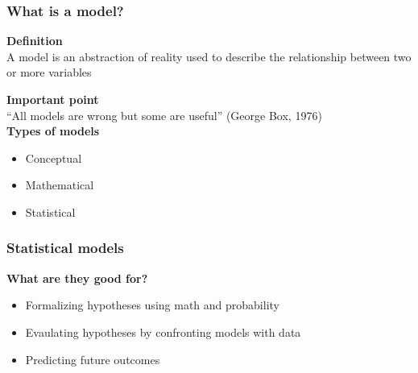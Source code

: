 \documentclass[color=usenames,dvipsnames]{beamer}\usepackage[]{graphicx}\usepackage[]{color}
\begin{document}







\begin{frame}
  \frametitle{What is a model?}
  \large
    {\bf Definition} \\
    A model is an abstraction of reality used to describe the
    relationship between two or more variables \par
    \pause
    \vfill %
  {\bf Important point} \\
  ``All models are wrong but some are useful'' (George Box, 1976) \\
  \pause
  \vfill
  {\bf Types of models}
  \begin{itemize}
    \item Conceptual
    \item Mathematical
    \item Statistical
  \end{itemize}
\end{frame}




\begin{frame}
  \frametitle{Statistical models}
  \large
  {\bf What are they good for?}
  \begin{itemize}[<+->]
    \item Formalizing hypotheses using math and probability
    \item Evaulating hypotheses by confronting models with data
    \item Predicting future outcomes
  \end{itemize}
\end{frame}
\end{document}
